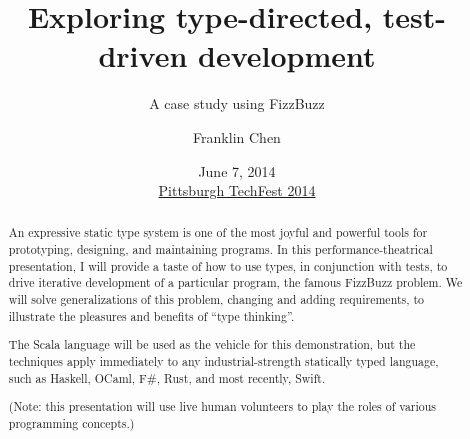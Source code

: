 {
}

\usepackage[utf8]{inputenc}

\usepackage[cache]{minted}


\title{Exploring type-directed, test-driven development}
\subtitle{A case study using FizzBuzz}
\author{Franklin Chen}
\date[Pittsburgh TechFest 2014]{June 7, 2014 \\ \href{http://www.pghtechfest.com/}{Pittsburgh TechFest 2014}}

\subject{Talks}




\maketitle

\begin{abstract}
  An expressive static type system is one of the most joyful and
  powerful tools for prototyping, designing, and maintaining
  programs. In this performance-theatrical presentation, I will
  provide a taste of how to use types, in conjunction with tests, to
  drive iterative development of a particular program, the famous
  FizzBuzz problem. We will solve generalizations of this problem,
  changing and adding requirements, to illustrate the pleasures and
  benefits of ``type thinking''.

  The Scala language will be used as the vehicle for this
  demonstration, but the techniques apply immediately to any
  industrial-strength statically typed language, such as Haskell,
  OCaml, F\#, Rust, and most recently, Swift.

  (Note: this presentation will use live human volunteers to play the
  roles of various programming concepts.)
\end{abstract}

\begin{frame}
  \titlepage
\end{frame}

